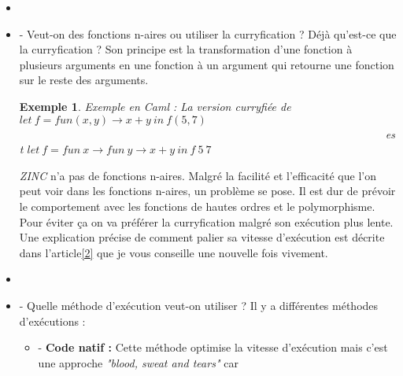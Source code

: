 \documentclass[10pt,a4paper]{report}
\newtheorem{ex}{Exemple}
\begin{document}
\begin{itemize}
	Petit point sur le typage, il peut être soit statique, soit dynamique et dans les deux cas, on peut avoir un typage
	fort ou un typage faible. On va définir tout ça :
	\begin{itemize}
		\item[] - typage \textbf{statique} : on vérifie, avant exécution, tout le code. Exemple : Caml
		\item[] - typage \textbf{dynamique} : on vérifie au fur et à mesure le code au moment où c'est nécessaire. Exemple : Python
		\item[] - typage \textbf{fort} : il faut que tous les types correspondent entre-eux quand on les associe. Exemple : Caml 
		\item[] - typage \textbf{faible} : il peut y avoir des associations entre deux types pas tout à fait pareils. Exemple : C, on peut
		faire une égalité entre un pointeur et un entier il va juste prévenir mais pas interdire. 
	\end{itemize} 
	\item[]
	\item[] - Veut-on des fonctions n-aires ou utiliser la curryfication ? Déjà qu'est-ce que la curryfication ? Son principe est la
	transformation d'une fonction à plusieurs arguments en une fonction à un argument qui retourne une fonction sur le reste des arguments.
	\smallbreak
	\begin{ex}
		Exemple en Caml : La version curryfiée de $let~f = fun(x,y) \rightarrow x+y~in~f(5,7)$
		\smallbreak
		~~~~~~~~~~~~~~~~~~~~~~~~~~~~~~~~~~~~~~~~~~~~~~~~~~~~~~~~~~~~~~~~~est $let~f = fun~x \rightarrow fun~y \rightarrow x+y~in~f~5~7$ 
	\end{ex}
	\medbreak
	\textit{ZINC} n'a pas de fonctions n-aires. Malgré la facilité et l'efficacité que l'on peut voir dans les fonctions n-aires, un problème
	se pose. Il est dur de prévoir le comportement avec les fonctions de hautes ordres et le polymorphisme. Pour éviter ça on va préférer la
	curryfication malgré son exécution plus lente. Une explication précise de comment palier sa vitesse d'exécution est décrite dans
	l'article\hyperref[ZINC]{[2]} que je vous conseille une nouvelle fois vivement.
	\item[]
	\item[] - Quelle méthode d'exécution veut-on utiliser ? Il y a différentes méthodes d'exécutions :
	\begin{itemize}
		\item[] - \textbf{Code natif :} Cette méthode optimise la vitesse d'exécution mais c'est une approche \textit{"blood, sweat and tears"} car

\end{itemize}
\end{itemize}
\end{document}
